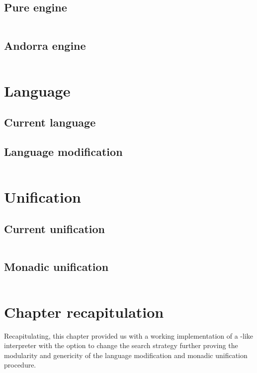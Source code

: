 \documentclass[thesis-solanki.tex]{files}
\begin{document}
\subsection{Pure engine}
\begin{singlespace}
\inputminted[linenos, firstline=26, lastline=46]{haskell}{haskell-proto3-absurd-silicon.hs}
\end{singlespace}

\subsection{Andorra engine}
\begin{singlespace}
\inputminted[linenos, firstline=29, lastline=75]{haskell}{haskell-proto3-diatomic-unbank.hs}
\end{singlespace}

\section{Language}
\subsection{Current language}

\subsection{Language modification}
\begin{singlespace}
  \inputminted[linenos, lastline=352]{haskell}{haskell-proto3-uplift-apart.hs}
\end{singlespace}

\section{Unification}
\subsection{Current unification}
\begin{singlespace}
  \inputminted[linenos, firstline=65, lastline=82]{haskell}{haskell-proto3-pentyl-skater.hs}
\end{singlespace}


\subsection{Monadic unification}
\begin{singlespace}
  \inputminted[linenos]{haskell}{haskell-proto3-bevy-icebox.hs}
\end{singlespace}


\section{Chapter recapitulation}
Recapitulating, this chapter provided us with a working implementation of a -like interpreter with the option to change
the search strategy further proving the modularity and genericity of the language modification and monadic unification procedure.
\end{document}
